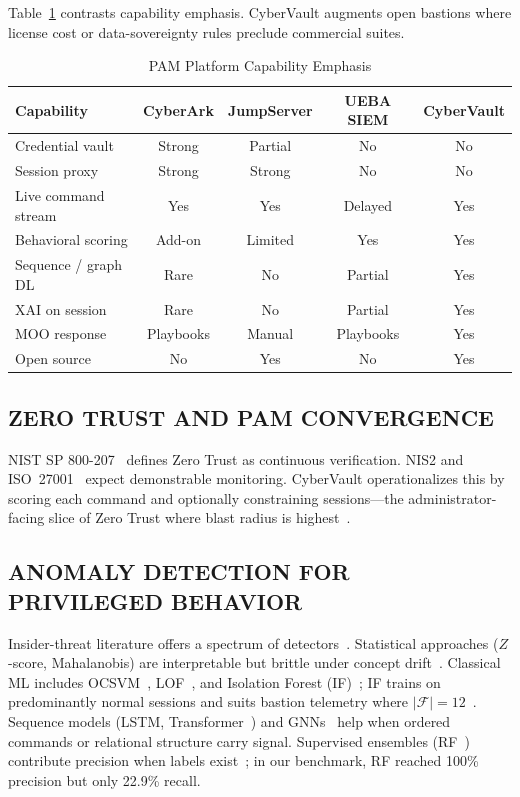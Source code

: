 Table~\ref{art-tab:pam-compare} contrasts capability emphasis. CyberVault augments open bastions where license cost or data-sovereignty rules preclude commercial suites.

\begin{table}[H][!t]
\caption{PAM Platform Capability Emphasis}
\label{art-tab:pam-compare}
\centering
\scriptsize
\begin{tabular*}{\textwidth}{@{\extracolsep{\fill}}lcccc@{}}
\toprule
\textbf{Capability} & CyberArk & JumpServer & UEBA SIEM & CyberVault \\
\midrule
Credential vault & Strong & Partial & No & No \\
Session proxy & Strong & Strong & No & No \\
Live command stream & Yes & Yes & Delayed & Yes \\
Behavioral scoring & Add-on & Limited & Yes & Yes \\
Sequence / graph DL & Rare & No & Partial & Yes \\
XAI on session & Rare & No & Partial & Yes \\
MOO response & Playbooks & Manual & Playbooks & Yes \\
Open source & No & Yes & No & Yes \\
\bottomrule
\end{tabular*}
\end{table}

\subsection{ZERO TRUST AND PAM CONVERGENCE}
NIST SP 800-207~\cite{ref22} defines Zero Trust as continuous verification. NIS2 and ISO~27001~\cite{ref28,ref29} expect demonstrable monitoring. CyberVault operationalizes this by scoring each command and optionally constraining sessions---the administrator-facing slice of Zero Trust where blast radius is highest~\cite{ref21}.

\subsection{ANOMALY DETECTION FOR PRIVILEGED BEHAVIOR}
Insider-threat literature offers a spectrum of detectors~\cite{ref6,ref7,ref11,ref24,ref32,ref40,ref42,ref45}. Statistical approaches ($Z$-score, Mahalanobis) are interpretable but brittle under concept drift~\cite{ref7}. Classical ML includes OCSVM~\cite{ref20}, LOF~\cite{ref19}, and Isolation Forest (IF)~\cite{ref8}; IF trains on predominantly normal sessions and suits bastion telemetry where $|\mathcal{F}|=12$~\cite{ref7,ref8}. Sequence models (LSTM, Transformer~\cite{ref10,ref31,ref36}) and GNNs~\cite{ref23,ref37} help when ordered commands or relational structure carry signal. Supervised ensembles (RF~\cite{ref30}) contribute precision when labels exist~\cite{ref9,ref11}; in our benchmark, RF reached 100\% precision but only 22.9\% recall.

